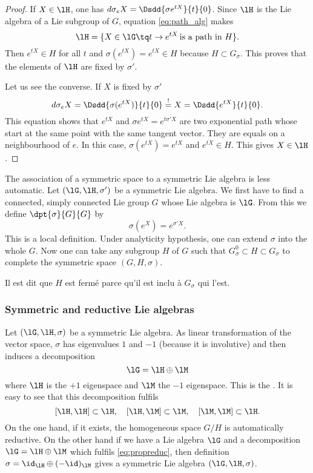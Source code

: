\begin{proof}
If $X\in \lH$, one has $d\sigma_eX=\Dsdd{\sigma e^{tX}}{t}{0}$. Since $\lH$ is the Lie algebra of a Lie subgroup of $G$, equation \eqref{eq:path_alg} makes
\[
  \lH=\{X\in\lG\tq t\to e^{tX}\,\text{is a path in $H$}\}.
\]
Then $e^{tX}\in H$ for all $t$ and $\sigma(e^{tX})=e^{tX}\in H$ because $H\subset G_{\sigma}$. This proves that the elements of $\lH$ are fixed by $\sigma'$.

Let us see the converse. If $X$ is fixed by $\sigma'$
\[
  d\sigma_eX=\Dsdd{\sigma(e^{tX})}{t}{0}\stackrel{!}{=}X=\Dsdd{e^{tX}}{t}{0}.
\]
This equation shows that $e^{tX}$ and $\sigma e^{tX}=e^{t\sigma' X}$ are two exponential path whose start at the same point with the same tangent vector. They are equals on a neighbourhood of $e$. In this case, $\sigma(e^{tX})=e^{tX}$ and $e^{tX}\in H$. This gives $X\in \lH$.

\end{proof}

The association of a symmetric space to a symmetric Lie algebra is less automatic. Let $(\lG,\lH,\sigma')$ be a symmetric Lie algebra. We first have to find a connected, simply connected Lie group $G$ whose Lie algebra is $\lG$. From this we define $\dpt{\sigma}{G}{G}$ by
\[
  \sigma(e^X)=e^{\sigma'X}.
\]
This is a local definition. Under analyticity hypothesis, one can extend $\sigma$ into the whole $G$. Now one can take any subgroup $H$ of $G$ such that $G_{\sigma}^0\subset H\subset G_{\sigma}$ to complete the symmetric space $(G,H,\sigma)$.

\begin{probleme}
Il est dit que $H$ est ferm\'e parce qu'il est inclu \`a $G_{\sigma}$ qui l'est.
\end{probleme}

\subsubsection{Symmetric and reductive Lie algebras}

Let $(\lG,\lH,\sigma)$ be a symmetric Lie algebra. As linear transformation of the vector space, $\sigma$ has eigenvalues $1$ and $-1$ (because it is involutive) and then induces a decomposition
\begin{equation}
\lG=\lH\oplus\lM
\end{equation}
where $\lH$ is the $+1$ eigenspace and $\lM$ the $-1$ eigenspace. This is the . It is easy to see that this decomposition fulfils
\begin{equation}  \label{eq:propreduc}
[\lH,\lH]\subset\lH,\quad[\lH,\lM]\subset\lM,\quad[\lM,\lM]\subset\lH.
\end{equation}
On the one hand, if it exists, the homogeneous space $G/H$ is automatically reductive. On the other hand if we have a Lie algebra $\lG$ and a decomposition $\lG=\lH\oplus\lM$ which fulfils \eqref{eq:propreduc}, then definition $\sigma=\id_{\lH}\oplus(-\id)_{\lM}$ gives a symmetric Lie algebra $(\lG,\lH,\sigma)$.

